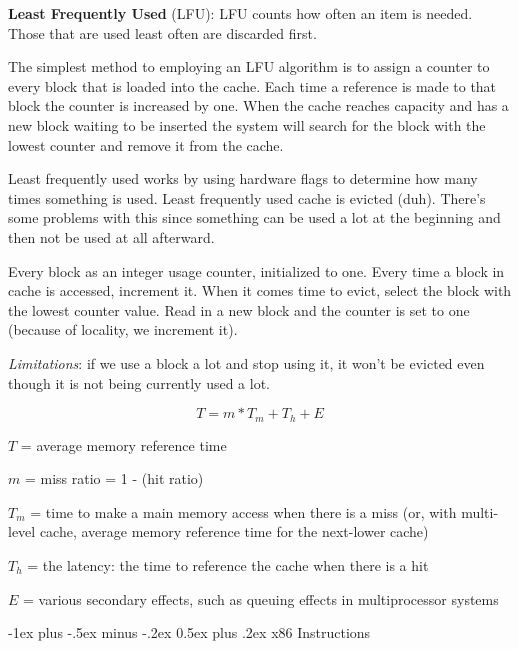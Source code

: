 \documentclass[10pt,landscape]{article}
\makeatletter
\renewcommand{\section}{\@startsection{section}{1}{0mm}%
                                {-1ex plus -.5ex minus -.2ex}%
                                {0.5ex plus .2ex}%
                                {\normalfont\large\bfseries}}
\makeatother
\begin{document}
\begin{multicols}{3}
{\bf Least Frequently Used} (LFU): LFU counts how often an item is needed. Those that are used least often are discarded first.

The simplest method to employing an LFU algorithm is to assign a counter to every block that is loaded into the cache. Each time a reference is made to that block the counter is increased by one. When the cache reaches capacity and has a new block waiting to be inserted the system will search for the block with the lowest counter and remove it from the cache.

Least frequently used works by using hardware flags to determine how many times something is used. Least frequently used cache is evicted 
(duh). There's some problems with this since something can be used a lot at the beginning and then not be used at all afterward.

Every block as an integer usage counter, initialized to one. Every time a block in cache is accessed, increment it. When it comes time to 
evict, select the block with the lowest counter value.  Read in a new block and the counter is set to one (because of locality, we increment 
it).

\emph{Limitations}: if we use a block a lot and stop using it, it won't be evicted even though it is not being currently used a lot.

$$T = m*T_m + T_h + E$$

$T$ = average memory reference time

$m$ = miss ratio = 1 - (hit ratio)

$T_m$ = time to make a main memory access when there is a miss (or, with multi-level cache, average memory reference time for the next-lower cache)

$T_h$ = the latency: the time to reference the cache when there is a hit

$E$ = various secondary effects, such as queuing effects in multiprocessor systems

\section{x86 Instructions}


\end{multicols}
\end{document}
